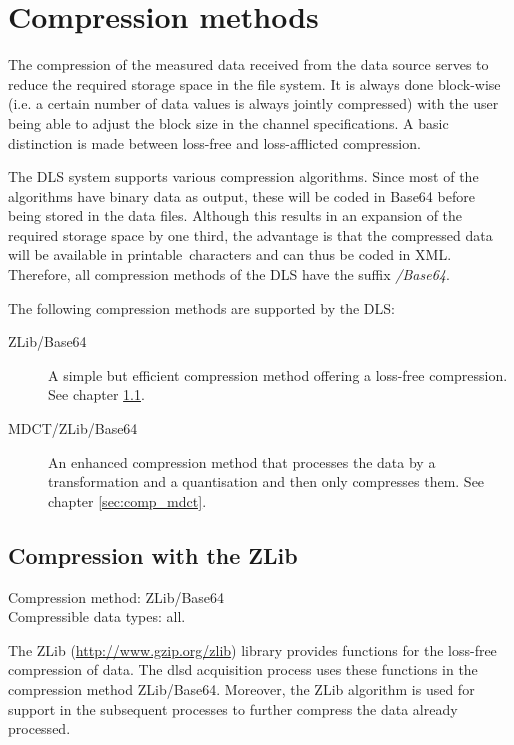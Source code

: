 \documentclass[a4paper,12pt,BCOR6mm,bibtotoc,idxtotoc]{scrbook}
\begin{document}
\chapter{Compression methods} \label{sec:comp} 

The compression of the measured data received from the data source serves to reduce the required storage space in the file system. It is always done block-wise (i.e. a certain number of data values is always jointly compressed) with the user being able to adjust the block size in the channel specifications. A basic distinction is made between loss-free and loss-afflicted compression.

The DLS system supports various compression algorithms. Since most of the algorithms have binary data as output, these will be coded in Base64 before being stored in the data files. Although this results in an expansion of the required storage space by one third, the advantage is that the compressed data will be available in \glqq printable\grqq\  characters and can thus be coded in XML. Therefore, all compression methods of the DLS have the suffix \textit{/Base64}.

The following compression methods are supported by the DLS:

\begin{description} 
\item[ZLib/Base64] A simple but efficient compression method offering a loss-free compression. See chapter \ref{sec:comp_zlib}. 
\item[MDCT/ZLib/Base64] An enhanced compression method that processes the data by a transformation and a quantisation and then only compresses them. See chapter \ref{sec:comp_mdct}. \end{description}


\section{Compression with the ZLib} \label{sec:comp_zlib}

Compression method: ZLib/Base64\\ Compressible data types: all.

The \glqq ZLib\grqq{} (\url{http://www.gzip.org/zlib}) library provides functions for the loss-free compression of data. The dlsd acquisition process uses these functions in the compression method ZLib/Base64. Moreover, the ZLib algorithm is used for support in the subsequent processes to further compress the data already processed.
\end{document}
